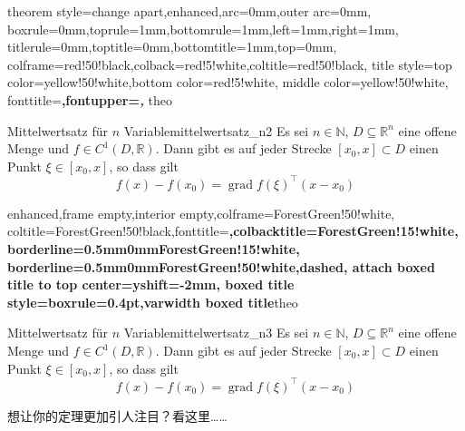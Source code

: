 \begin{dispExample}
%
  {theorem style=change apart,enhanced,arc=0mm,outer arc=0mm,
  boxrule=0mm,toprule=1mm,bottomrule=1mm,left=1mm,right=1mm,
  titlerule=0mm,toptitle=0mm,bottomtitle=1mm,top=0mm,
  colframe=red!50!black,colback=red!5!white,coltitle=red!50!black,
  title style={top color=yellow!50!white,bottom color=red!5!white,
    middle color=yellow!50!white},
  fonttitle=\bfseries\sffamily\normalsize,fontupper=\normalsize\itshape,
  }{theo}

\begin{YetAnotherTheorem}{Mittelwertsatz f\"{u}r $n$ Variable}{mittelwertsatz_n2}%
  Es sei $n\in\mathbb{N}$, $D\subseteq\mathbb{R}^n$ eine offene Menge und
  $f\in C^{1}(D,\mathbb{R})$. Dann gibt es auf jeder Strecke
  $[x_0,x]\subset D$ einen Punkt $\xi\in[x_0,x]$, so dass gilt
  \begin{equation*}
  f(x)-f(x_0) = \operatorname{grad} f(\xi)^{\top}(x-x_0)
  \end{equation*}
\end{YetAnotherTheorem}
\end{dispExample}


\begin{dispExample}
%
{enhanced,frame empty,interior empty,colframe=ForestGreen!50!white,
  coltitle=ForestGreen!50!black,fonttitle=\bfseries,colbacktitle=ForestGreen!15!white,
  borderline={0.5mm}{0mm}{ForestGreen!15!white},
  borderline={0.5mm}{0mm}{ForestGreen!50!white,dashed},
  attach boxed title to top center={yshift=-2mm},
  boxed title style={boxrule=0.4pt},varwidth boxed title}{theo}

\begin{YetAnotherTheorem}{Mittelwertsatz f\"{u}r $n$ Variable}{mittelwertsatz_n3}%
  Es sei $n\in\mathbb{N}$, $D\subseteq\mathbb{R}^n$ eine offene Menge und
  $f\in C^{1}(D,\mathbb{R})$. Dann gibt es auf jeder Strecke
  $[x_0,x]\subset D$ einen Punkt $\xi\in[x_0,x]$, so dass gilt
  \begin{equation*}
  f(x)-f(x_0) = \operatorname{grad} f(\xi)^{\top}(x-x_0)
  \end{equation*}
\end{YetAnotherTheorem}
\end{dispExample}


\clearpage
想让你的定理更加引人注目？看这里……

